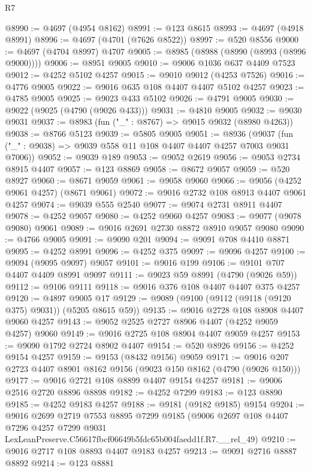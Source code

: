 \begin{lexlean}{R7}
\begin{coremodule}
@8990 := @4697 (@4954 @8162)
@8991 := @123 @8615
@8993 := @4697 (@4918 @8991)
@8996 := @4697 (@4701 (@7626 @8522))
@8997 := @520 @8556
@9000 := @4697 (@4704 @8997) @4707
@9005 := @8985 (@8988 (@8990 (@8993 (@8996 @9000))))
@9006 := @8951 @9005
@9010 := @9006 @1036 @637 @4409 @7523
@9012 := @4252 @5102 @4257
@9015 := @9010 @9012 (@4253 @7526)
@9016 := @4776 @9005
@9022 := @9016 @635 @108 @4407 @4407 @5102 @4257
@9023 := @4785 @9005
@9025 := @9023 @433 @5102
@9026 := @4791 @9005
@9030 := @9022 (@9025 (@4790 (@9026 @433)))
@9031 := @4810 @9005
@9032 := @9030 @9031
@9037 := @8983 (fun ("_" : @8767) => @9015 @9032 (@8980 @4263))
@9038 := @8766 @5123
@9039 := @5805 @9005
@9051 := @8936
    (@9037 (fun ("_" : @9038) => @9039 @558 @11 @108 @4407 @4407 @4257 @7003 @9031 @7006))
@9052 := @9039 @189
@9053 := @9052 @2619
@9056 := @9053 @2734 @8915 @4407
@9057 := @123 @8869
@9058 := @8672 @9057
@9059 := @520 @8927
@9060 := @8671 @9059
@9061 := @9058 @9060
@9066 := @9056 (@4252 @9061 @4257) (@8671 @9061)
@9072 := @9016 @2732 @108 @8913 @4407 @9061 @4257
@9074 := @9039 @555 @2540
@9077 := @9074 @2731 @8911 @4407
@9078 := @4252 @9057
@9080 := @4252 @9060 @4257
@9083 := @9077 (@9078 @9080) @9061
@9089 := @9016 @2691 @2730 @8872 @8910 @9057 @9080
@9090 := @4766 @9005
@9091 := @9090 @201
@9094 := @9091 @708 @4410 @8871
@9095 := @4252 @8991
@9096 := @4252 @375
@9097 := @9096 @4257
@9100 := @9094 (@9095 @9097) @9057
@9101 := @9016 @199
@9106 := @9101 @707 @4407 @4409 @8991 @9097
@9111 := @9023 @59 @8991 (@4790 (@9026 @59))
@9112 := @9106 @9111
@9118 := @9016 @376 @108 @4407 @4407 @375 @4257
@9120 := @4897 @9005 @17
@9129 := @9089 (@9100 (@9112 (@9118 (@9120 @375) @9031)) (@5205 @8615 @59))
@9135 := @9016 @2728 @108 @8908 @4407 @9060 @4257
@9143 := @9052 @2525 @2727 @8906 @4407 (@4252 @9059 @4257) @9060
@9149 := @9016 @2725 @108 @8904 @4407 @9059 @4257
@9153 := @9090 @1792 @2724 @8902 @4407
@9154 := @520 @8926
@9156 := @4252 @9154 @4257
@9159 := @9153 (@8432 @9156) @9059
@9171 := @9016 @207 @2723 @4407 @8901 @8162 @9156 (@9023 @150 @8162 (@4790 (@9026 @150)))
@9177 := @9016 @2721 @108 @8899 @4407 @9154 @4257
@9181 := @9006 @2516 @2720 @8896 @8898
@9182 := @4252 @7299
@9183 := @123 @8890
@9185 := @4252 @9183 @4257
@9188 := @9181 (@9182 @9185) @9154
@9204 := @9016
    @2699
    @2719
    @7553
    @8895
    @7299
    @9185
    (@9006
      @2697
      @108
      @4407
      @7296
      @4257
      @7299
      @9031
      LexLeanPreserve.C56617fbcf06649b5fdc65b004faedd1f.R7.__rel_49)
@9210 := @9016 @2717 @108 @8893 @4407 @9183 @4257
@9213 := @9091 @2716 @8887 @8892
@9214 := @123 @8881

\end{coremodule}
\end{lexlean}
